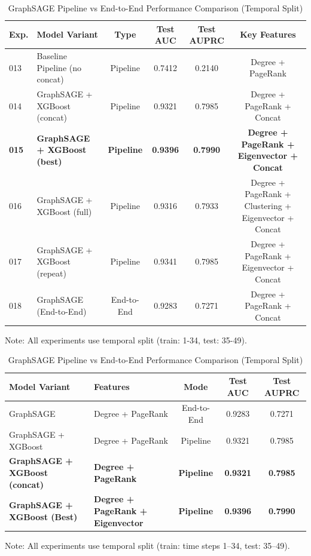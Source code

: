 \begin{table}[htbp]
\centering
\caption{GraphSAGE Pipeline vs End-to-End Performance Comparison (Temporal Split)}
\label{tab:results_pipeline}
\begin{tabular}{l l c c c c}
\hline
\textbf{Exp.} & \textbf{Model Variant} & \textbf{Type} & \textbf{Test AUC} & \textbf{Test AUPRC} & \textbf{Key Features} \\
\hline
013 & Baseline Pipeline (no concat) & Pipeline & 0.7412 & 0.2140 & Degree + PageRank \\
014 & GraphSAGE + XGBoost (concat) & Pipeline & 0.9321 & 0.7985 & Degree + PageRank + Concat \\
\textbf{015} & \textbf{GraphSAGE + XGBoost (best)} & \textbf{Pipeline} & \textbf{0.9396} & \textbf{0.7990} & \textbf{Degree + PageRank + Eigenvector + Concat} \\
016 & GraphSAGE + XGBoost (full) & Pipeline & 0.9316 & 0.7933 & Degree + PageRank + Clustering + Eigenvector + Concat \\
017 & GraphSAGE + XGBoost (repeat) & Pipeline & 0.9341 & 0.7985 & Degree + PageRank + Eigenvector + Concat \\
018 & GraphSAGE (End-to-End) & End-to-End & 0.9283 & 0.7271 & Degree + PageRank + Concat \\
\hline
\end{tabular}
\vspace{0.5em}
\footnotesize{Note: All experiments use temporal split (train: 1-34, test: 35-49).}
\end{table}


\begin{table}[htbp]
\centering
\caption{GraphSAGE Pipeline vs End-to-End Performance Comparison (Temporal Split)}
\label{tab:results_pipeline}
\begin{tabular}{l l c c c}
\hline
\textbf{Model Variant} & \textbf{Features} & \textbf{Mode} & \textbf{Test AUC} & \textbf{Test AUPRC} \\
\hline
GraphSAGE & Degree + PageRank & End-to-End & 0.9283 & 0.7271 \\
GraphSAGE + XGBoost & Degree + PageRank & Pipeline & 0.9321 & 0.7985 \\
\textbf{GraphSAGE + XGBoost (concat)} & \textbf{Degree + PageRank} & \textbf{Pipeline} & \textbf{0.9321} & \textbf{0.7985} \\
\textbf{GraphSAGE + XGBoost (Best)} & \textbf{Degree + PageRank + Eigenvector} & \textbf{Pipeline} & \textbf{0.9396} & \textbf{0.7990} \\
\hline
\end{tabular}
\vspace{0.5em}
\footnotesize{Note: All experiments use temporal split (train: time steps 1--34, test: 35--49).}
\end{table}